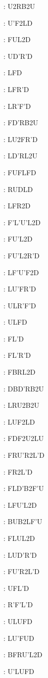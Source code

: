 \documentclass[9pt]{article}
\begin{document}
{\begin{multicols}{6}
: U2RB2U

: U'F2LD

: FUL2D

: UD'R'D

: LFD

: LFR'D

: LR'F'D

: FD'RB2U

: LU2FR'D

: LD'RL2U

: FUFLFD

: RUDLD

: LFR2D

: F'L'U'L2D

: FU'L2D

: FU'L2R'D

: LF'U'F2D

: LU'FR'D

: ULR'F'D

: ULFD

: FL'D

: FL'R'D

: FBRL2D

: DBD'RB2U

: LRU2B2U

: LUF2LD

: FDF2U2LU

: FRU'R2L'D

: FR2L'D

: FLD'B2F'U

: LFU'L2D

: BUB2LF'U

: FLUL2D

: LUD'R'D

: FU'R2L'D

: UFL'D

: R'F'L'D

: ULUFD

: LU'FUD

: BFRU'L2D

: U'LUFD


\end{multicols}}
\end{document}
